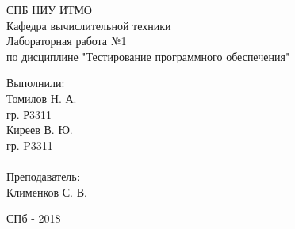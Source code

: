\begin{center}
СПБ НИУ ИТМО\\
\vspace{1cm}
Кафедра вычислительной техники\\
\vspace{5.5cm}
\huge{Лабораторная работа №1}\\
\vspace{0.3cm}
\large{по дисциплине
"Тестирование программного обеспечения"\\}
\vspace{1.7cm}


\end{center}
\vspace{6.5cm}
\begin{adjustwidth*}{13.5cm}{-1.5cm}
Выполнили:\\
Томилов Н. А.\\
гр. Р3311\\
Киреев В. Ю.\\
гр. P3311\\
\\
Преподаватель:\\
Клименков С. В.\\
\end{adjustwidth*}

\vspace{4.5cm}
\begin{center}
СПб - 2018
\end{center}